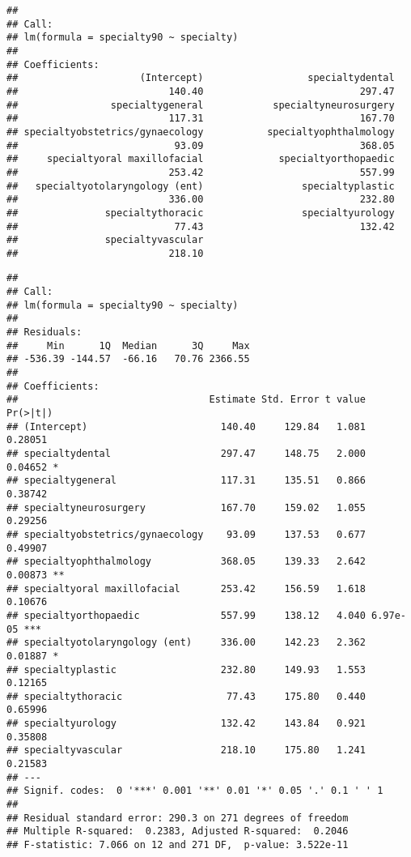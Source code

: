 \documentclass[]{article}
\begin{document}
\begin{verbatim}
## 
## Call:
## lm(formula = specialty90 ~ specialty)
## 
## Coefficients:
##                     (Intercept)                  specialtydental  
##                          140.40                           297.47  
##                specialtygeneral            specialtyneurosurgery  
##                          117.31                           167.70  
## specialtyobstetrics/gynaecology           specialtyophthalmology  
##                           93.09                           368.05  
##     specialtyoral maxillofacial             specialtyorthopaedic  
##                          253.42                           557.99  
##   specialtyotolaryngology (ent)                 specialtyplastic  
##                          336.00                           232.80  
##               specialtythoracic                 specialtyurology  
##                           77.43                           132.42  
##               specialtyvascular  
##                          218.10
\end{verbatim}

\begin{verbatim}
## 
## Call:
## lm(formula = specialty90 ~ specialty)
## 
## Residuals:
##     Min      1Q  Median      3Q     Max 
## -536.39 -144.57  -66.16   70.76 2366.55 
## 
## Coefficients:
##                                 Estimate Std. Error t value Pr(>|t|)    
## (Intercept)                       140.40     129.84   1.081  0.28051    
## specialtydental                   297.47     148.75   2.000  0.04652 *  
## specialtygeneral                  117.31     135.51   0.866  0.38742    
## specialtyneurosurgery             167.70     159.02   1.055  0.29256    
## specialtyobstetrics/gynaecology    93.09     137.53   0.677  0.49907    
## specialtyophthalmology            368.05     139.33   2.642  0.00873 ** 
## specialtyoral maxillofacial       253.42     156.59   1.618  0.10676    
## specialtyorthopaedic              557.99     138.12   4.040 6.97e-05 ***
## specialtyotolaryngology (ent)     336.00     142.23   2.362  0.01887 *  
## specialtyplastic                  232.80     149.93   1.553  0.12165    
## specialtythoracic                  77.43     175.80   0.440  0.65996    
## specialtyurology                  132.42     143.84   0.921  0.35808    
## specialtyvascular                 218.10     175.80   1.241  0.21583    
## ---
## Signif. codes:  0 '***' 0.001 '**' 0.01 '*' 0.05 '.' 0.1 ' ' 1
## 
## Residual standard error: 290.3 on 271 degrees of freedom
## Multiple R-squared:  0.2383, Adjusted R-squared:  0.2046 
## F-statistic: 7.066 on 12 and 271 DF,  p-value: 3.522e-11
\end{verbatim}
\end{document}
